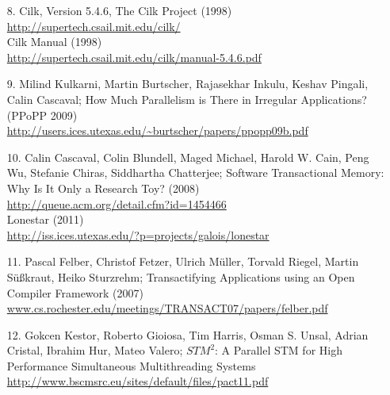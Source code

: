 \documentclass[a4paper,10pt]{report}
\begin{document}
\begin{itemize}
 \item [8.] Cilk, Version 5.4.6, The Cilk Project (1998) \\ \url{http://supertech.csail.mit.edu/cilk/}
	      \\ Cilk Manual (1998) \\ \url{http://supertech.csail.mit.edu/cilk/manual-5.4.6.pdf}
 \item[9.] Milind Kulkarni, Martin Burtscher, Rajasekhar Inkulu, Keshav Pingali, Calin Cascaval; How Much Parallelism is There in Irregular Applications? (PPoPP 2009) \\ \url{http://users.ices.utexas.edu/~burtscher/papers/ppopp09b.pdf}
 \item[10.] Calin Cascaval, Colin Blundell, Maged Michael, Harold W. Cain, Peng Wu, Stefanie Chiras, Siddhartha Chatterjee; Software Transactional Memory: Why Is It Only a Research Toy? (2008) \\ \url{http://queue.acm.org/detail.cfm?id=1454466}
	    \\ Lonestar (2011) \\ \url{http://iss.ices.utexas.edu/?p=projects/galois/lonestar}
 \item[11.] Pascal Felber, Christof Fetzer, Ulrich Müller, Torvald Riegel, Martin Süßkraut, Heiko Sturzrehm; Transactifying Applications using an Open Compiler Framework (2007) \\ \url{www.cs.rochester.edu/meetings/TRANSACT07/papers/felber.pdf}
 \item[12.] Gokcen Kestor, Roberto Gioiosa, Tim Harris, Osman S. Unsal, Adrian Cristal, Ibrahim Hur, Mateo Valero; $STM^2$: A Parallel STM for High Performance
Simultaneous Multithreading Systems \\
\url{http://www.bscmsrc.eu/sites/default/files/pact11.pdf}

\end{itemize}


\end{document}
